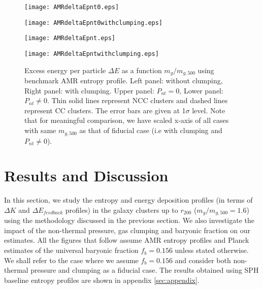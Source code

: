 \documentclass[a4paper,fleqn,usenatbib]{mnras}
\begin{document}
\begin{figure*}
\begin{minipage}{8.5cm}
 \texttt{[image: AMRdeltaEpnt0.eps]}
\end{minipage}
\begin{minipage}{8.5cm}
 \texttt{[image: AMRdeltaEpnt0withclumping.eps]}
\end{minipage}  
\begin{minipage}{8.5cm}
 \texttt{[image: AMRdeltaEpnt.eps]}
\end{minipage}
\begin{minipage}{8.8cm}
 \texttt{[image: AMRdeltaEpntwithclumping.eps]}
\end{minipage}   
\caption{
Excess energy per particle $\Delta E$  as a function  $m_g/m_{g,500}$ using benchmark AMR entropy profile.
Left panel: without clumping, Right panel: with clumping. Upper panel: $P_{nt}=0$, Lower panel: $P_{nt}\neq0$. Thin solid lines represent NCC clusters and dashed lines represent CC clusters. The error bars are given at  1$\sigma$ level.
Note that for meaningful comparison, we have scaled x-axis of all cases with same $m_{g,500}$ as that of fiducial case (i.e with clumping  and $P_{nt}\neq0$).
}
\label{fig:AmrdeltaE}
\end{figure*}



\section{Results and Discussion}
In this section, we study the entropy and energy deposition profiles (in terms of $\Delta K$ and $\Delta E_{feedback}$ profiles) in the galaxy clusters up to  $r_{200}$ ($m_g/m_{g,500}=1.6$) using the methodology discussed in the previous section. We also investigate the impact of the non-thermal pressure, gas clumping and baryonic fraction on our estimates. All the figures that follow assume AMR 
entropy profiles and Planck estimates of the universal baryonic fraction $f_b=0.156$ unless stated otherwise. We shall refer to the case where we assume $f_b=0.156$ and consider both non-thermal pressure and clumping as a fiducial case. The results obtained using SPH baseline entropy profiles are shown in appendix \ref{sec:appendix}. 
\end{document}
